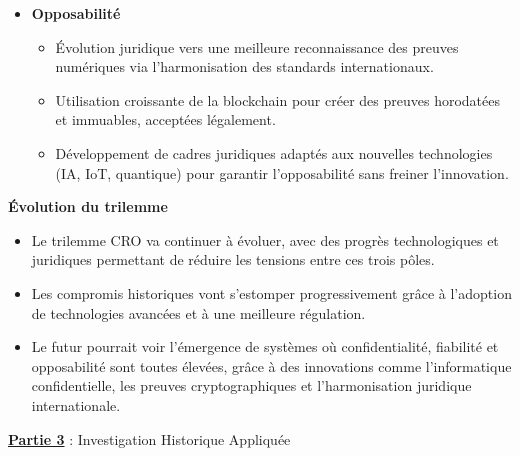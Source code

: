 \documentclass[12pt, a4paper]{article}
\newcommand{\partie}[1]{\textbf{\underline{Partie #1}}}
\begin{document}
\begin{enumerate}[label=\textbf{\arabic*.}, start=3]
\begin{itemize}
			\item \textbf{Opposabilité}
			\begin{itemize}
				\item Évolution juridique vers une meilleure reconnaissance des preuves numériques via l'harmonisation des standards internationaux.
				\item Utilisation croissante de la blockchain pour créer des preuves horodatées et immuables, acceptées légalement.
				\item Développement de cadres juridiques adaptés aux nouvelles technologies (IA, IoT, quantique) pour garantir l'opposabilité sans freiner l'innovation.
			\end{itemize}
		\end{itemize}
		
		\textbf{Évolution du trilemme}
		
		\begin{itemize}
			\item Le trilemme CRO va continuer à évoluer, avec des progrès technologiques et juridiques permettant de réduire les tensions entre ces trois pôles.
			\item Les compromis historiques vont s'estomper progressivement grâce à l'adoption de technologies avancées et à une meilleure régulation.
			\item Le futur pourrait voir l'émergence de systèmes où confidentialité, fiabilité et opposabilité sont toutes élevées, grâce à des innovations comme l'informatique confidentielle, les preuves cryptographiques et l'harmonisation juridique internationale.
		\end{itemize}
	\end{enumerate}
	
	
	\partie{3} : Investigation Historique Appliquée
	
\end{document}

